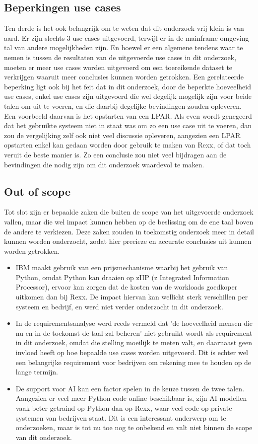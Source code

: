 \subsection{Beperkingen use cases}
Ten derde is het ook belangrijk om te weten dat dit onderzoek vrij klein is van aard. Er zijn slechts 3 use cases uitgevoerd, terwijl er in de mainframe omgeving tal van andere mogelijkheden zijn. En hoewel er een algemene tendens waar te nemen is tussen de resultaten van de uitgevoerde use cases in dit onderzoek, moeten er meer use cases worden uitgevoerd om een toereikende dataset te verkrijgen waaruit meer conclusies kunnen worden getrokken. Een gerelateerde beperking ligt ook bij het feit dat in dit onderzoek, door de beperkte hoeveelheid use cases, enkel use cases zijn uitgevoerd die wel degelijk mogelijk zijn voor beide talen om uit te voeren, en die daarbij degelijke bevindingen zouden opleveren. Een voorbeeld daarvan is het opstarten van een LPAR. Als even wordt genegeerd dat het gebruikte systeem niet in staat was om zo een use case uit te voeren, dan zou de vergelijking zelf ook niet veel discussie opleveren, aangezien een LPAR opstarten enkel kan gedaan worden door gebruik te maken van Rexx, of dat toch veruit de beste manier is. Zo een conclusie zou niet veel bijdragen aan de bevindingen die nodig zijn om dit onderzoek waardevol te maken.

\subsection{Out of scope}
Tot slot zijn er bepaalde zaken die buiten de scope van het uitgevoerde onderzoek vallen, maar die wel impact kunnen hebben op de beslissing om de ene taal boven de andere te verkiezen. Deze zaken zouden in toekomstig onderzoek meer in detail kunnen worden onderzocht, zodat hier precieze en accurate conclusies uit kunnen worden getrokken.
\begin{itemize}
    \item IBM maakt gebruik van een prijsmechanisme waarbij het gebruik van Python, omdat Python kan draaien op zIIP (z Integrated Information Processor), ervoor kan zorgen dat de kosten van de workloads goedkoper uitkomen dan bij Rexx. De impact hiervan kan wellicht sterk verschillen per systeem en bedrijf, en werd niet verder onderzocht in dit onderzoek.
    \item In de requirementsanalyse werd reeds vermeld dat 'de hoeveelheid mensen die nu en in de toekomst de taal zal beheren' niet gebruikt wordt als requirement in dit onderzoek, omdat die stelling moeilijk te meten valt, en daarnaast geen invloed heeft op hoe bepaalde use cases worden uitgevoerd. Dit is echter wel een belangrijke requirement voor bedrijven om rekening mee te houden op de lange termijn.
    \item De support voor AI kan een factor spelen in de keuze tussen de twee talen. Aangezien er veel meer Python code online beschikbaar is, zijn AI modellen vaak beter getraind op Python dan op Rexx, waar veel code op private systemen van bedrijven staat. Dit is een interessant onderwerp om te onderzoeken, maar is tot nu toe nog te onbekend en valt niet binnen de scope van dit onderzoek.
\end{itemize}


